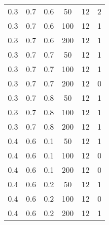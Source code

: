 \begin{table}[h]
\begin{center}
\begin{threeparttable}
\begin{tabular}{|c|c|c|c|c|c|}
   \hline
	0.3 &  0.7 &  0.6 &   50 &    12 &     2 \\
	0.3 &  0.7 &  0.6 &  100 &    12 &     1 \\
	0.3 &  0.7 &  0.6 &  200 &    12 &     1 \\
   \hline
	0.3 &  0.7 &  0.7 &   50 &    12 &     1 \\
	0.3 &  0.7 &  0.7 &  100 &    12 &     1 \\
	0.3 &  0.7 &  0.7 &  200 &    12 &     0 \\
   \hline
	0.3 &  0.7 &  0.8 &   50 &    12 &     1 \\
	0.3 &  0.7 &  0.8 &  100 &    12 &     1 \\
	0.3 &  0.7 &  0.8 &  200 &    12 &     1 \\
   \hline
	0.4 &  0.6 &  0.1 &   50 &    12 &     1 \\
	0.4 &  0.6 &  0.1 &  100 &    12 &     0 \\
	0.4 &  0.6 &  0.1 &  200 &    12 &     0 \\
   \hline
	0.4 &  0.6 &  0.2 &   50 &    12 &     1 \\
	0.4 &  0.6 &  0.2 &  100 &    12 &     0 \\
	0.4 &  0.6 &  0.2 &  200 &    12 &     1 \\
   \hline
    		\end{tabular}
        \end{threeparttable}
	\end{center}
\end{table}
